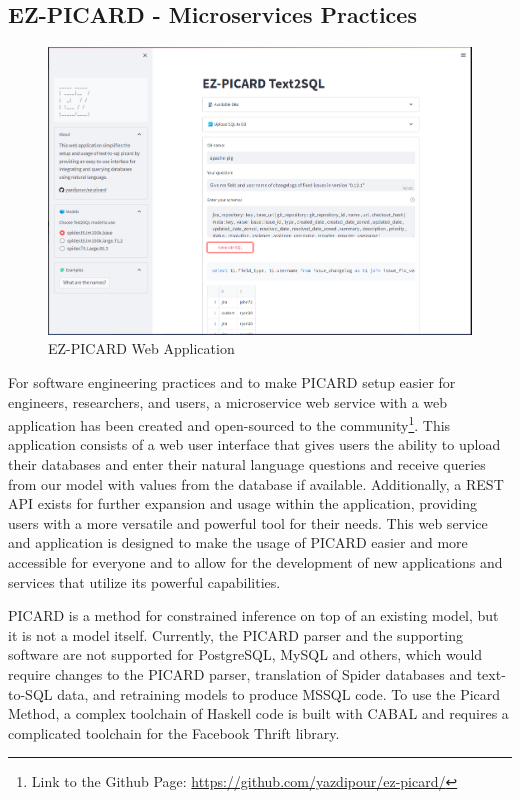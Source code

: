 \clearpage
\subsection{EZ-PICARD - Microservices Practices}

\begin{figure}[h]
    \centering
    \includegraphics[width=1\textwidth]{pics/ez/ui.png}
    \caption{EZ-PICARD Web Application}
    \label{fig:ezpicard}
\end{figure}

For software engineering practices and to make PICARD setup easier for engineers, researchers, and users, a microservice web service with a web application has been created and open-sourced to the community\footnote[1]{Link to the Github Page: \url{https://github.com/yazdipour/ez-picard/}}. This application consists of a web user interface that gives users the ability to upload their databases and enter their natural language questions and receive queries from our model with values from the database if available. Additionally, a REST API exists for further expansion and usage within the application, providing users with a more versatile and powerful tool for their needs. This web service and application is designed to make the usage of PICARD easier and more accessible for everyone and to allow for the development of new applications and services that utilize its powerful capabilities.

PICARD is a method for constrained inference on top of an existing model, but it is not a model itself. Currently, the PICARD parser and the supporting software are not supported for PostgreSQL, MySQL and others, which would require changes to the PICARD parser, translation of Spider databases and text-to-SQL data, and retraining models to produce MSSQL code. To use the Picard Method, a complex toolchain of Haskell code is built with CABAL and requires a complicated toolchain for the Facebook Thrift library.

